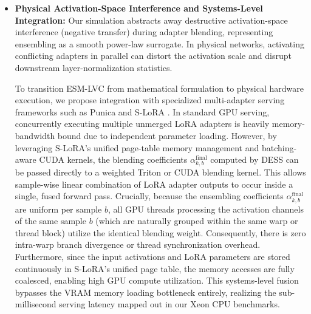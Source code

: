 \begin{itemize}
    \item \textbf{Physical Activation-Space Interference and Systems-Level Integration:} Our simulation abstracts away destructive activation-space interference (negative transfer) during adapter blending, representing ensembling as a smooth power-law surrogate. In physical networks, activating conflicting adapters in parallel can distort the activation scale and disrupt downstream layer-normalization statistics. 
    
    To transition ESM-LVC from mathematical formulation to physical hardware execution, we propose integration with specialized multi-adapter serving frameworks such as Punica \cite{chen2023punica} and S-LoRA \cite{sheng2023slora}. In standard GPU serving, concurrently executing multiple unmerged LoRA adapters is heavily memory-bandwidth bound due to independent parameter loading. However, by leveraging S-LoRA's unified page-table memory management and batching-aware CUDA kernels, the blending coefficients $\alpha^{\text{final}}_{k, b}$ computed by DESS can be passed directly to a weighted Triton or CUDA blending kernel. This allows sample-wise linear combination of LoRA adapter outputs to occur inside a single, fused forward pass. 
    Crucially, because the ensembling coefficients $\alpha^{\text{final}}_{k, b}$ are uniform per sample $b$, all GPU threads processing the activation channels of the same sample $b$ (which are naturally grouped within the same warp or thread block) utilize the identical blending weight. Consequently, there is zero intra-warp branch divergence or thread synchronization overhead. Furthermore, since the input activations and LoRA parameters are stored continuously in S-LoRA's unified page table, the memory accesses are fully coalesced, enabling high GPU compute utilization. This systems-level fusion bypasses the VRAM memory loading bottleneck entirely, realizing the sub-millisecond serving latency mapped out in our Xeon CPU benchmarks.
    

\end{itemize}
